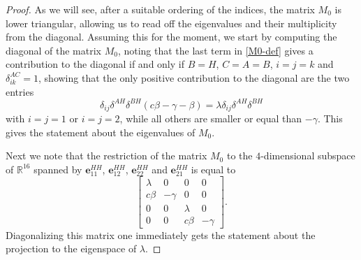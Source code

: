 \documentclass[11pt]{article}
\begin{document}
\begin{proof}
As we will see, after a suitable ordering of the indices, the matrix $M_0$ is lower triangular, allowing us to read off the eigenvalues and their multiplicity from the diagonal.  Assuming this for the moment, we start by computing the diagonal of the matrix $M_0$,
noting that the last term in \eqref{M0-def} gives a contribution to the diagonal if and only if 
$B=H$,
$C=A=B$, $i=j=k$ and
 $\delta_{ik}^{AC}=1$, showing that the only positive contribution to the diagonal are the two entries
$$
\delta_{ij}\delta^{AH}\delta^{BH} (c\beta-\gamma-\beta)=\lambda \delta_{ij}\delta^{AH}\delta^{BH} 
$$
with $i=j=1$ or $i=j=2$, while all others are smaller or equal than $-\gamma$.  This gives the statement about the eigenvalues of $M_0$.

Next we note that 
the restriction of  the matrix $M_0$ 
to the $4$-dimensional subspace of $\mathbb R^{16}$ spanned by 
  $\mathbf e_{11}^{HH}$,   $\mathbf e_{12}^{HH}$,   $\mathbf e_{22}^{HH}$ and  $\mathbf e_{21}^{HH}$ is equal to
  $$
\begin{bmatrix}
    \lambda&0&0&0\\
    c\beta&-\gamma&0&0\\
    0&0&\lambda&0\\
    0&0&c\beta&-\gamma
\end{bmatrix}.
  $$
Diagonalizing this matrix one immediately gets the statement about the projection to the eigenspace of $\lambda$.


\end{proof}
\end{document}
